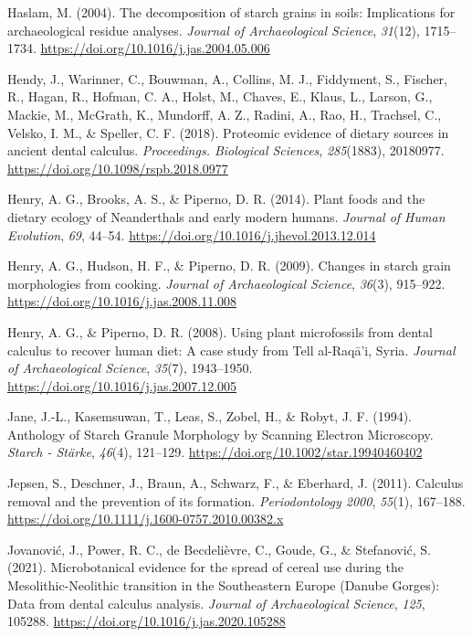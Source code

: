 \documentclass[
  b5paper,
]{book}
\newlength{\cslhangindent}
\newenvironment{CSLReferences}[2] %
 {\begin{list}{}{%
  \setlength{\itemindent}{0pt}
  \setlength{\leftmargin}{0pt}
  \setlength{\parsep}{0pt}
  \ifodd #1
   \setlength{\leftmargin}{\cslhangindent}
   \setlength{\itemindent}{-1\cslhangindent}
  \fi
  \setlength{\itemsep}{#2\baselineskip}}}
 {\end{list}}
\begin{document}
\begin{CSLReferences}{1}{0}
Haslam, M. (2004). The decomposition of starch grains in soils:
Implications for archaeological residue analyses. \emph{Journal of
Archaeological Science}, \emph{31}(12), 1715--1734.
\url{https://doi.org/10.1016/j.jas.2004.05.006}

Hendy, J., Warinner, C., Bouwman, A., Collins, M. J., Fiddyment, S.,
Fischer, R., Hagan, R., Hofman, C. A., Holst, M., Chaves, E., Klaus, L.,
Larson, G., Mackie, M., McGrath, K., Mundorff, A. Z., Radini, A., Rao,
H., Trachsel, C., Velsko, I. M., \& Speller, C. F. (2018). Proteomic
evidence of dietary sources in ancient dental calculus.
\emph{Proceedings. Biological Sciences}, \emph{285}(1883), 20180977.
\url{https://doi.org/10.1098/rspb.2018.0977}

Henry, A. G., Brooks, A. S., \& Piperno, D. R. (2014). Plant foods and
the dietary ecology of {Neanderthals} and early modern humans.
\emph{Journal of Human Evolution}, \emph{69}, 44--54.
\url{https://doi.org/10.1016/j.jhevol.2013.12.014}

Henry, A. G., Hudson, H. F., \& Piperno, D. R. (2009). Changes in starch
grain morphologies from cooking. \emph{Journal of Archaeological
Science}, \emph{36}(3), 915--922.
\url{https://doi.org/10.1016/j.jas.2008.11.008}

Henry, A. G., \& Piperno, D. R. (2008). Using plant microfossils from
dental calculus to recover human diet: A case study from {Tell}
al-{Raqā}'i, {Syria}. \emph{Journal of Archaeological Science},
\emph{35}(7), 1943--1950.
\url{https://doi.org/10.1016/j.jas.2007.12.005}

Jane, J.-L., Kasemsuwan, T., Leas, S., Zobel, H., \& Robyt, J. F.
(1994). Anthology of {Starch Granule Morphology} by {Scanning Electron
Microscopy}. \emph{Starch - Stärke}, \emph{46}(4), 121--129.
\url{https://doi.org/10.1002/star.19940460402}

Jepsen, S., Deschner, J., Braun, A., Schwarz, F., \& Eberhard, J.
(2011). Calculus removal and the prevention of its formation.
\emph{Periodontology 2000}, \emph{55}(1), 167--188.
\url{https://doi.org/10.1111/j.1600-0757.2010.00382.x}

Jovanović, J., Power, R. C., de Becdelièvre, C., Goude, G., \&
Stefanović, S. (2021). Microbotanical evidence for the spread of cereal
use during the {Mesolithic-Neolithic} transition in the {Southeastern
Europe} ({Danube Gorges}): {Data} from dental calculus analysis.
\emph{Journal of Archaeological Science}, \emph{125}, 105288.
\url{https://doi.org/10.1016/j.jas.2020.105288}


\end{CSLReferences}
\end{document}
